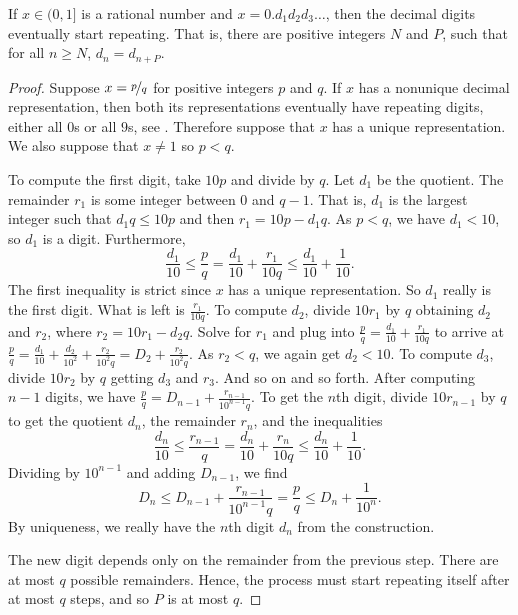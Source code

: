 \begin{prop} \label{prop:rationaldecimal}
If $x \in (0,1]$ is a rational number and $x = 0.d_1d_2d_3\ldots$,
then the decimal digits eventually start repeating.  That is, there are
positive integers $N$ and $P$, such that for all $n \geq N$, $d_n = d_{n+P}$.
\end{prop}

\begin{proof}
Suppose $x = \nicefrac{p}{q}$ for positive integers $p$ and $q$.
If $x$ has a nonunique decimal representation, then both its representations
eventually have repeating digits,
either all $0$s or all $9$s,
see .
Therefore suppose that $x$ has a unique representation.
We also suppose that $x \neq 1$ so $p < q$.

To compute the first digit, take $10 p$ and divide by
$q$.  Let $d_1$ be the quotient.
The remainder $r_1$ is some integer
between $0$ and $q-1$.  That is, $d_1$ is the largest integer
such that $d_1 q \leq 10p$ and then $r_1 = 10p - d_1q$.
As $p < q$, we have $d_1 < 10$, so $d_1$ is a digit.
Furthermore,
\begin{equation*}
\frac{d_1}{10} \leq \frac{p}{q} =
\frac{d_1}{10} + \frac{r_1}{10q} \leq \frac{d_1}{10} +
\frac{1}{10} .
\end{equation*}
The first inequality is strict since $x$ has a
unique representation.  So $d_1$ really is the first digit.
What is left is $\frac{r_1}{10q}$.
To compute $d_2$, divide $10 r_1$ by $q$ obtaining $d_2$
and $r_2$, where $r_2 = 10 r_1 - d_2 q$.
Solve for $r_1$ and plug into
$\frac{p}{q} = \frac{d_1}{10} + \frac{r_1}{10 q}$
to arrive at
$\frac{p}{q} = \frac{d_1}{10} + \frac{d_2}{{10}^2} +
\frac{r_2}{{10}^2 q} = D_2 +
\frac{r_2}{{10}^2 q}$.
As $r_2 < q$, we again get $d_2 < 10$.
To compute $d_3$, divide $10 r_2$ by $q$
getting $d_3$ and $r_3$.  And so on and so forth.
After computing $n-1$ digits, we have
$\frac{p}{q} = D_{n-1} + \frac{r_{n-1}}{10^{n-1} q}$.
To get the $n$th digit,
divide $10 r_{n-1}$ by $q$
to get the quotient $d_n$, the remainder $r_n$, and the inequalities
\begin{equation*}
\frac{d_n}{10} \leq \frac{r_{n-1}}{q} =
\frac{d_n}{10} + \frac{r_n}{10q} \leq \frac{d_n}{10} +
\frac{1}{10} .
\end{equation*}
Dividing by $10^{n-1}$ and adding $D_{n-1}$, we find
\begin{equation*}
D_n \leq D_{n-1} + \frac{r_{n-1}}{10^{n-1} q} = \frac{p}{q} \leq D_n +
\frac{1}{10^n} .
\end{equation*}
By uniqueness, we really have
the $n$th digit $d_n$ from the construction.

The new digit depends only on the remainder from the previous
step.
There are at most $q$ possible remainders.
Hence, the process must start repeating itself after at most $q$ steps,
and so $P$ is at most $q$.
\end{proof}

